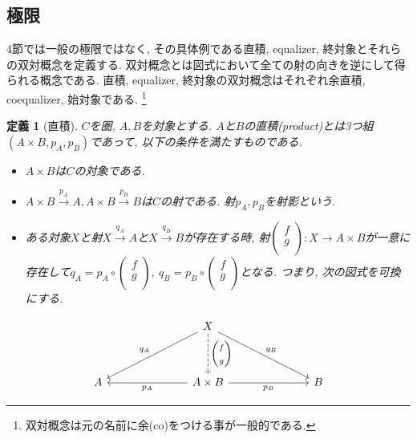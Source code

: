 \documentclass[a4paper,12pt]{ltjsarticle}
\theoremstyle{break}
\newtheorem{defn}[thm]{定義}
\newcommand{\xr}[1]{\xrightarrow{#1}}
\newcommand{\ci}{\circ}
\newcommand{\ti}{\times}
\numberwithin{equation}{section}
\begin{document}
\subsection{極限}

4節では一般の極限ではなく, その具体例である直積, equalizer, 終対象とそれらの双対概念を定義する. 
双対概念とは図式において全ての射の向きを逆にして得られる概念である. 
直積, equalizer, 終対象の双対概念はそれぞれ余直積, coequalizer, 始対象である.
\footnote{
  双対概念は元の名前に余(co)をつける事が一般的である.
  }

\begin{defn}[直積]
  $C$を圏, $A, B$を対象とする. 
  $A$と$B$の直積(product)とは3つ組$(A \ti B, p_A, p_B)$であって, 以下の条件を満たすものである.
  \begin{itemize} 
    \item $A \ti B$は$C$の対象である. 
    \item $A \ti B \xr{p_A} A, A \ti B \xr{p_B} B$は$C$の射である. 射$p_A,p_B$を射影という. 
    \item ある対象$X$と射$X \xr{q_A} A$と$X \xr{q_B} B$が存在する時, 射$\begin{pmatrix} f \\ g \\ \end{pmatrix}: X \to A \ti B$が一意に存在して$q_A = p_A \ci \begin{pmatrix} f \\ g \\ \end{pmatrix}$, $q_B = p_B \ci \begin{pmatrix} f \\ g \\ \end{pmatrix}$となる. 
    つまり, 次の図式を可換にする. 
  \end{itemize}   
  \[\begin{tikzcd}
    &&& X \\
    \\
    A &&& {A \ti B} &&& B
    \arrow["{q_A}"', from=1-4, to=3-1]
    \arrow["{q_B}", from=1-4, to=3-7]
    \arrow["{\begin{pmatrix} f \\ g \\ \end{pmatrix}}", dashed, from=1-4, to=3-4]
    \arrow["{p_B}"', from=3-4, to=3-7]
    \arrow["{p_A}", from=3-4, to=3-1]
  \end{tikzcd}\]
\end{defn}
\end{document}
